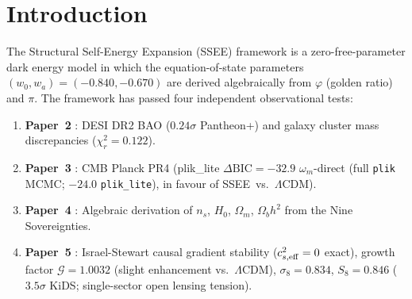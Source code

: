\documentclass[12pt,a4paper]{article}
\newcommand{\SSEE}{\textsc{SSEE}}
\newcommand{\wz}{w_0}
\newcommand{\wa}{w_a}
\begin{document}
\begin{abstract}
(2026--2028). Because $m_\phi\simeq 41$~eV makes the particle non-relativistic at
$z_{\rm nr}\sim10^5 \gg z_{\rm rec}$, it behaves as cold dark matter for the CMB: the
acoustic peaks shift by only $\sim1\,\ell$ relative to
$\Lambda$CDM. The same free-streaming that resolves $S_8$ also reaches the
$\sigma_8(R{=}8)$ window probed by RSD, so the two-sector $f\sigma_8$ tension rises
modestly to $0.93\sigma$ (from the $0.70\sigma$ single-sector baseline), still
$<1\sigma$ and close to $\Lambda$CDM ($0.73\sigma$): the deliberate cost of lowering
$\sigma_8$ to fix the lensing amplitude. We explicitly note that the reported TT residual is
computed against our own CLASS $\Lambda$CDM rather than a full Planck \texttt{plik}
likelihood with covariance; a paper-grade CMB validation is deferred.
\end{abstract}

\clearpage
{\small\tableofcontents}
\clearpage

\section{Introduction}
\label{sec:intro}

The Structural Self-Energy Expansion (\SSEE) framework \citep{SSEE_Paper1} is a
zero-free-parameter dark energy model in which the equation-of-state parameters
$(\wz, \wa) = (-0.840, -0.670)$ are derived algebraically from $\varphi$ (golden
ratio) and $\pi$. The framework has passed four independent observational tests:

\begin{enumerate}
  \item \textbf{Paper~2} \citep{SSEE_Paper2}: DESI DR2 \citep{AbdulKarim2025} BAO ($0.24\sigma$ Pantheon+) and
    galaxy cluster mass discrepancies ($\chi^2_r = 0.122$).
  \item \textbf{Paper~3} \citep{SSEE_Paper3}: CMB Planck PR4 (plik\_lite
    $\Delta\mathrm{BIC} = -32.9$ $\omega_m$-direct (full \texttt{plik} MCMC; $-24.0$ \texttt{plik\_lite}), in favour of \SSEE\ vs.\ $\Lambda$CDM).
  \item \textbf{Paper~4} \citep{SSEE_Paper4}: Algebraic derivation of $n_s$, $H_0$,
    $\Omega_m$, $\Omega_b h^2$ from the Nine Sovereignties.
  \item \textbf{Paper~5} \citep{SSEE_Paper5}: Israel-Stewart \citep{IsraelStewart1979} causal gradient stability
    ($c^2_{s,\rm eff} = 0$ exact), growth factor $\mathcal{G}=1.0032$ (slight enhancement vs.\ $\Lambda$CDM),
    $\sigma_8 = 0.834$, $S_8 = 0.846$ ($3.5\sigma$ KiDS; single-sector open lensing tension).
\end{enumerate}
\end{document}
